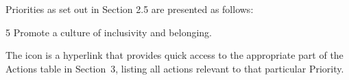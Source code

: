 
Priorities as set out in Section 2.5 are presented as follows:

\begin{priority}{5}
Promote a culture of inclusivity and belonging.
\hfill{
    \hypersetup{hidelinks}
    \hyperlink{p5}{\gotoactionsymbol{}}
}
\end{priority}

The \gotoactionsymbol{} icon is a hyperlink that provides quick access to the appropriate part of the Actions table in Section~3, listing all actions relevant to that particular Priority.

\endgroup 

